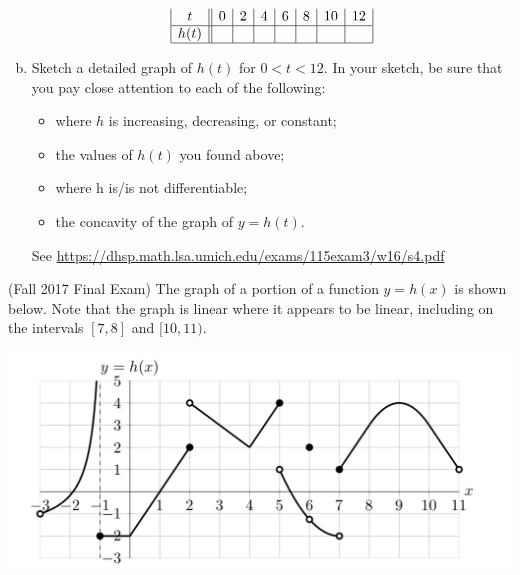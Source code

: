 \documentclass[11pt]{exam}
\begin{document}
\begin{questions}
\begin{enumerate}[(a)]
$$\begin{array}{|c||c|c|c|c|c|c|c|}
	t & 0 & 2 & 4 & 6 & 8 & 10 & 12 \\
	\hline
	h(t) & & & & & & & \\
	\hline
	\end{array}$$
	\item Sketch a detailed graph of $h(t)$ for $0 < t < 12$. In your sketch, be sure that you pay close attention to each of the following:
\begin{multicols}{2}
 \begin{itemize}
 	\item where $h$ is increasing, decreasing, or constant;
 	\item  the values of $h(t)$ you found above;
 	\item where h is/is not differentiable;
 	\item the concavity of the graph of $y = h(t)$.
 \end{itemize}
 \end{multicols}
 \begin{solution}
   See \href{https://dhsp.math.lsa.umich.edu/exams/115exam3/w16/s4.pdf}{https://dhsp.math.lsa.umich.edu/exams/115exam3/w16/s4.pdf}
 \end{solution}
\end{enumerate}
\question (Fall 2017 Final Exam) %
	The graph of a portion of a function $y = h(x)$ is shown below. Note that the graph is linear where it appears to be linear, including on the intervals $[7, 8]$ and $[10, 11)$.
        \vspace{-0.8cm}
        \begin{center}
          \includegraphics[scale=0.5]{Figures/graph4.png}
        \end{center}
        \vspace{-0.4cm}
\end{questions}
\end{document}
